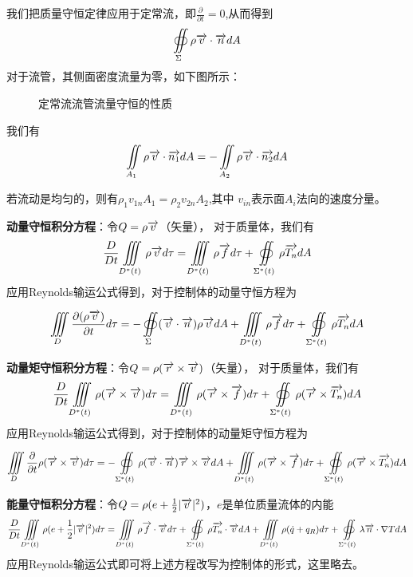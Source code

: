 我们把质量守恒定律应用于定常流，即$\frac{\partial}{\partial t}=0$,从而得到
\begin{equation}
\oiint\limits_{\Sigma} \rho \overrightarrow{v}\cdot \overrightarrow{n} dA
\end{equation}
对于流管，其侧面密度流量为零，如下图所示：
\begin{figure}[!ht]
\def\svgwidth{5cm}
\centering

\caption{定常流流管流量守恒的性质}\label{fig:41ST}
\end{figure}

我们有
\begin{equation}
\iint\limits_{A_1} \rho\overrightarrow{v}\cdot \overrightarrow{n_1} dA=-\iint\limits_{A_2} \rho\overrightarrow{v}\cdot \overrightarrow{n_2} dA
\end{equation}

若流动是均匀的，则有$\rho_1 v_{1n} A_1 = \rho_2 v_{2n} A_2$,其中 $v_{in}$表示面$A_i$法向的速度分量。


\textbf{动量守恒积分方程}：令$Q=\rho\overrightarrow{v}$（矢量），
对于质量体，我们有
\begin{equation}
\frac{D}{Dt}\iiint\limits_{D^*(t)} \rho \overrightarrow{v} d\tau = \iiint\limits_{D^*(t)} \rho \overrightarrow{f} d\tau + 
\oiint\limits_{\Sigma^*(t)} \rho \overrightarrow{T_n} dA
\end{equation}
应用Reynolds输运公式得到，对于控制体的动量守恒方程为

\begin{equation}
\iiint\limits_{D}\frac{\partial (\rho\overrightarrow{v})}{\partial t} d\tau = - \oiint\limits_{\Sigma} (\overrightarrow{v}\cdot \overrightarrow{n})\rho \overrightarrow{v} dA +
\iiint\limits_{D^*(t)} \rho \overrightarrow{f} d\tau + 
\oiint\limits_{\Sigma^*(t)} \rho \overrightarrow{T_n} dA
\end{equation}

\textbf{动量矩守恒积分方程}：令$Q=\rho(\overrightarrow{r} \times \overrightarrow{v})$（矢量），
对于质量体，我们有
\begin{equation}
\frac{D}{Dt}\iiint\limits_{D^*(t)} \rho(\overrightarrow{r} \times \overrightarrow{v}) d\tau = \iiint\limits_{D^*(t)} \rho (\overrightarrow{r}\times \overrightarrow{f}) d\tau + 
\oiint\limits_{\Sigma^*(t)} \rho (\overrightarrow{r} \times \overrightarrow{T_n}) dA
\end{equation}
应用Reynolds输运公式得到，对于控制体的动量矩守恒方程为

\begin{equation}
\iiint\limits_{D}\frac{\partial}{\partial t}\rho(\overrightarrow{r} \times \overrightarrow{v}) d\tau = 
-\oiint\limits_{\Sigma^*(t)} \rho (\overrightarrow{v} \cdot \overrightarrow{n})\overrightarrow{r} \times \overrightarrow{v} dA+
 \iiint\limits_{D^*(t)} \rho (\overrightarrow{r}\times \overrightarrow{f}) d\tau + 
\oiint\limits_{\Sigma^*(t)} \rho (\overrightarrow{r} \times \overrightarrow{T_n}) dA
\end{equation}


\textbf{能量守恒积分方程}：令$Q=\rho(e+\frac{1}{2}|\overrightarrow{v}|^2)$，$e$是单位质量流体的内能
\begin{equation}
\frac{D}{Dt}\iiint\limits_{D^*(t)} \rho(e+\frac{1}{2}|\overrightarrow{v}|^2) d\tau = \iiint\limits_{D^*(t)} \rho \overrightarrow{f}\cdot\overrightarrow{v} d\tau + 
\oiint\limits_{\Sigma^*(t)} \rho \overrightarrow{T_n}\cdot\overrightarrow{v} dA + \iiint\limits_{D^*(t)}\rho (\dot{q}+q_R)d\tau +
\oiint\limits_{\Sigma^*(t)} \lambda \overrightarrow{n}\cdot \nabla T dA
\end{equation}
应用Reynolds输运公式即可将上述方程改写为控制体的形式，这里略去。
